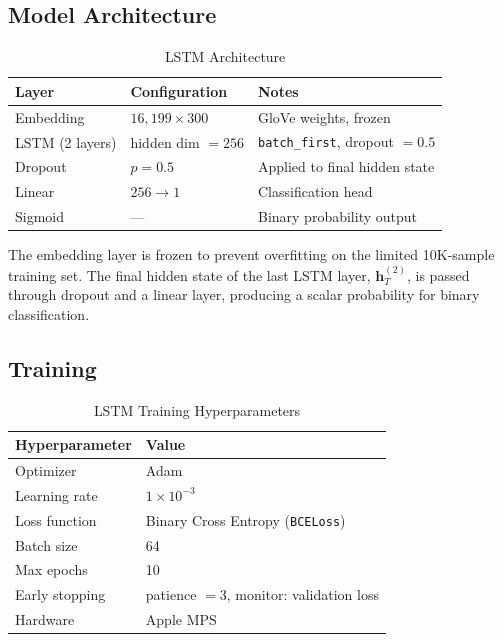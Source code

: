 \documentclass[11pt, a4paper]{article}
\begin{document}
\subsection{Model Architecture}

\begin{table}[h]
\centering
\caption{LSTM Architecture}
\begin{tabular}{lll}
\toprule
\textbf{Layer} & \textbf{Configuration} & \textbf{Notes} \\
\midrule
Embedding       & $16{,}199 \times 300$  & GloVe weights, frozen \\
LSTM (2 layers) & hidden dim $= 256$     & \texttt{batch\_first}, dropout $= 0.5$ \\
Dropout         & $p = 0.5$              & Applied to final hidden state \\
Linear          & $256 \rightarrow 1$    & Classification head \\
Sigmoid         & ---                    & Binary probability output \\
\bottomrule
\end{tabular}
\end{table}

The embedding layer is frozen to prevent overfitting on the limited 10K-sample training set. The final hidden state of the last LSTM layer, $\mathbf{h}_T^{(2)}$, is passed through dropout and a linear layer, producing a scalar probability for binary classification.

\subsection{Training}

\begin{table}[h]
\centering
\caption{LSTM Training Hyperparameters}
\begin{tabular}{ll}
\toprule
\textbf{Hyperparameter} & \textbf{Value} \\
\midrule
Optimizer       & Adam \\
Learning rate   & $1 \times 10^{-3}$ \\
Loss function   & Binary Cross Entropy (\texttt{BCELoss}) \\
Batch size      & 64 \\
Max epochs      & 10 \\
Early stopping  & patience $= 3$, monitor: validation loss \\
Hardware        & Apple MPS \\
\bottomrule
\end{tabular}
\end{table}
\end{document}
